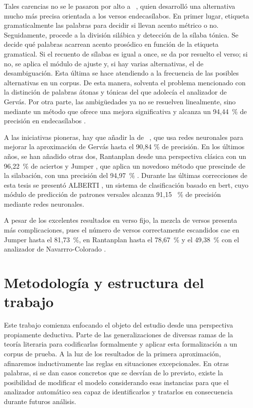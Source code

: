 Tales carencias no se le pasaron por alto a \citeauthor{navarrocolorado2015}~\parencite*{navarrocolorado2015,navarrocolorado2017}, quien desarrolló una alternativa mucho más precisa orientada a los versos endecasílabos. En primer lugar, etiqueta gramaticalmente las palabras para decidir si llevan acento métrico o no. Seguidamente, procede a la división silábica y detección de la sílaba tónica. Se decide qué palabras acarrean acento prosódico en función de la etiqueta gramatical. Si el recuento de sílabas es igual a once, se da por resuelto el verso; si no, se aplica el módulo de ajuste y, si hay varias alternativas, el de desambiguación. Esta última se hace atendiendo a la frecuencia de las posibles alternativas en un corpus. De esta manera, solventa el problema mencionado con la distinción de palabras átonas y tónicas del que adolecía el analizador de Gervás. Por otra parte, las ambigüedades ya no se resuelven linealmente, sino mediante un método que ofrece una mejora significativa y alcanza un 94{,}44~\% de precisión en endecasílabos \parencite[51735]{marco2021}.

A las iniciativas pioneras, hay que añadir la de \citeauthor{agirrezabal2017}~\parencite*{agirrezabal2017}, que usa redes neuronales para mejorar la aproximación de Gervás hasta el {90{,}84} \% de precisión. En los últimos años, se han añadido otras dos, Rantanplan \parencite{rosa2020} desde una perspectiva clásica con un 96{,}22~\% de aciertos \parencite[51740]{marco2021} y Jumper \parencite{marco2021b}, que aplica un novedoso método que prescinde de la silabación, con una precisión del 94{,}97~\% \parencite[51740]{marco2021}. Durante las últimas correcciones de esta tesis se presentó ALBERTI \parencite{rosa2023}, un sistema de clasificación basado en \acs{bert}, cuyo módulo de predicción de patrones versales alcanza {91{,}15} ~\% de precisión mediante redes neuronales.

A pesar de los excelentes resultados en verso fijo, la mezcla de versos presenta más complicaciones, pues el número de versos correctamente escandidos cae en Jumper hasta el 81{,}73~\%, en Rantanplan hasta el 78{,}67~\% y el 49{,}38~\% con el analizador de Navarrro-Colorado \parencite[51740]{marco2021}.

\section{Metodología y estructura del trabajo}
Este trabajo comienza enfocando el objeto del estudio desde una perspectiva propiamente deductiva. Parte de las generalizaciones de diversas ramas de la teoría literaria para codificarlas formalmente y aplicar esta formalización a un corpus de prueba. A la luz de los resultados de la primera aproximación, afinaremos inductivamente las reglas en situaciones excepcionales. En otras palabras, si se dan casos concretos que se desvían de lo previsto, existe la posibilidad de modificar el modelo considerando esas instancias para que el analizador automático sea capaz de identificarlos y tratarlos en consecuencia durante futuros análisis.

